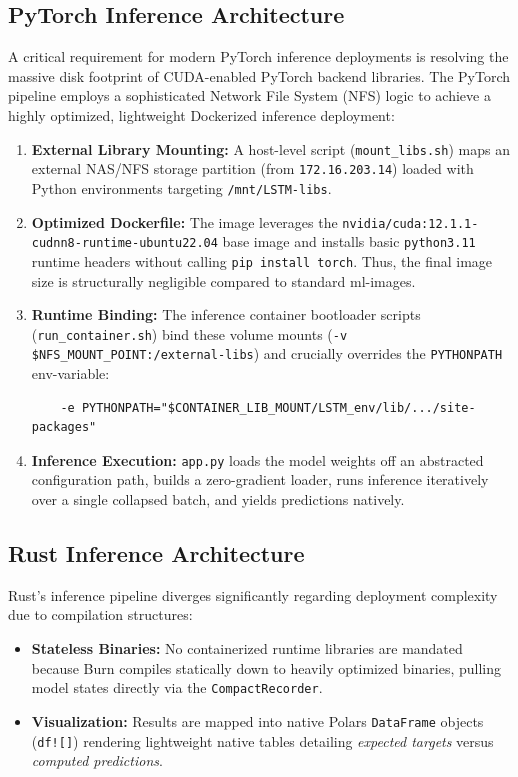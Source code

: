 \documentclass[12pt]{article}
\begin{document}
\subsection{PyTorch Inference Architecture}
A critical requirement for modern PyTorch inference deployments is resolving the massive disk footprint of CUDA-enabled PyTorch backend libraries. The PyTorch pipeline employs a sophisticated Network File System (NFS) logic to achieve a highly optimized, lightweight Dockerized inference deployment:
\begin{enumerate}
    \item \textbf{External Library Mounting:} A host-level script (\texttt{mount\_libs.sh}) maps an external NAS/NFS storage partition (from \texttt{172.16.203.14}) loaded with Python environments targeting \texttt{/mnt/LSTM-libs}.
    \item \textbf{Optimized Dockerfile:} The image leverages the \texttt{nvidia/cuda:12.1.1-cudnn8-runtime-ubuntu22.04} base image and installs basic \texttt{python3.11} runtime headers without calling \texttt{pip install torch}. Thus, the final image size is structurally negligible compared to standard ml-images.
    \item \textbf{Runtime Binding:} The inference container bootloader scripts (\texttt{run\_container.sh}) bind these volume mounts (\texttt{-v \$NFS\_MOUNT\_POINT:/external-libs}) and crucially overrides the \texttt{PYTHONPATH} env-variable:
    \begin{verbatim}
    -e PYTHONPATH="$CONTAINER_LIB_MOUNT/LSTM_env/lib/.../site-packages"
    \end{verbatim}
    \item \textbf{Inference Execution:} \texttt{app.py} loads the model weights off an abstracted configuration path, builds a zero-gradient loader, runs inference iteratively over a single collapsed batch, and yields predictions natively. 
\end{enumerate}

\subsection{Rust Inference Architecture}
Rust's inference pipeline diverges significantly regarding deployment complexity due to compilation structures:
\begin{itemize}
    \item \textbf{Stateless Binaries:} No containerized runtime libraries are mandated because Burn compiles statically down to heavily optimized binaries, pulling model states directly via the \texttt{CompactRecorder}.
    \item \textbf{Visualization:} Results are mapped into native Polars \texttt{DataFrame} objects (\texttt{df![]}) rendering lightweight native tables detailing \textit{expected targets} versus \textit{computed predictions}.
\end{itemize}
\end{document}
